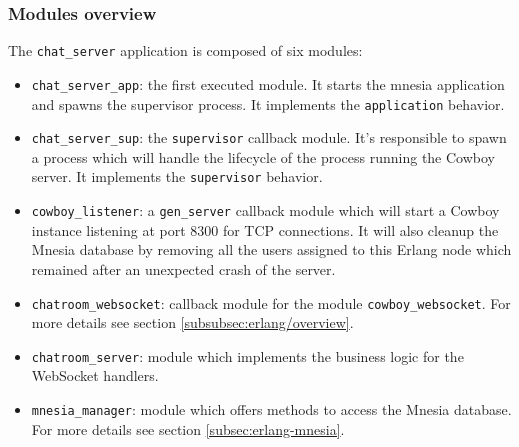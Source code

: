 \subsubsection{Modules overview}
The \texttt{chat\_server} application is composed of six modules:
\begin{itemize}
    \item \texttt{chat\_server\_app}: the first executed module. It starts the mnesia application and spawns the supervisor process. It implements the \texttt{application} behavior.
    
    \item \texttt{chat\_server\_sup}: the \texttt{supervisor} callback module. It's responsible to spawn a process which will handle the lifecycle of the process running the Cowboy server. It implements the \texttt{supervisor} behavior.
    
    \item \texttt{cowboy\_listener}: a \texttt{gen\_server} callback module which will start a Cowboy instance listening at port 8300 for TCP connections. It will also cleanup the Mnesia database by removing all the users assigned to this Erlang node which remained after an unexpected crash of the server.
    
    \item \texttt{chatroom\_websocket}: callback module for the module \texttt{cowboy\_websocket}. For more details see section \vref{subsubsec:erlang/overview}.
    \item \texttt{chatroom\_server}: module which implements the business logic for the WebSocket handlers.
    
    \item \texttt{mnesia\_manager}: module which offers methods to access the Mnesia database. For more details see section \vref{subsec:erlang-mnesia}. 
\end{itemize}

